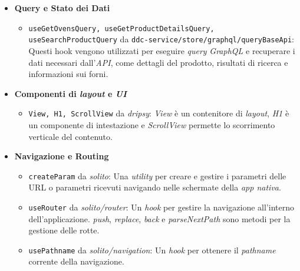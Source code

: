 \begin{itemize}
    \item \textbf{Query e Stato dei Dati}
    \begin{itemize}
        \item \texttt{useGetOvensQuery, useGetProductDetailsQuery, useSearchProductQuery} da \texttt{ddc-service/store/graphql/queryBaseApi}: Questi hook vengono utilizzati per eseguire \textit{query} \textit{GraphQL} e recuperare i dati necessari dall'\textit{API}, 
        come dettagli del prodotto, risultati di ricerca e informazioni sui forni.
    \end{itemize}

    \item \textbf{Componenti di \textit{layout} e \textit{UI}}
    \begin{itemize}
        \item \texttt{View, H1, ScrollView} da \textit{dripsy}: \textit{View} è un contenitore di \textit{layout}, \textit{H1} è un componente di intestazione e \textit{ScrollView} permette lo scorrimento verticale del contenuto.
    \end{itemize}

    \item \textbf{Navigazione e Routing}
    \begin{itemize}
        \item \texttt{createParam} da \textit{solito}: Una \textit{utility} per creare e gestire i parametri delle URL o parametri ricevuti navigando nelle schermate della \textit{app nativa}.
        \item \texttt{useRouter} da \textit{solito/router}: Un \textit{hook} per gestire la navigazione all'interno dell'applicazione. \textit{push}, \textit{replace}, \textit{back} e \textit{parseNextPath} sono metodi per la gestione delle rotte.
        \item \texttt{usePathname} da \textit{solito/navigation}: Un \textit{hook} per ottenere il \textit{pathname} corrente della navigazione.
    \end{itemize}


\end{itemize}
